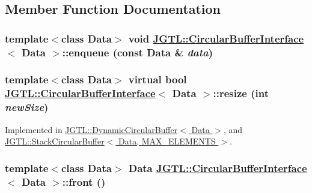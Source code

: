 \subsection{Member Function Documentation}
\hypertarget{class_j_g_t_l_1_1_circular_buffer_interface_3de938116256fe2b2db95f8f0d55ced9}{
\subsubsection[enqueue]{\setlength{\rightskip}{0pt plus 5cm}template$<$class Data$>$ void \hyperlink{class_j_g_t_l_1_1_circular_buffer_interface}{JGTL::Circular\-Buffer\-Interface}$<$ Data $>$::enqueue (const Data \& {\em data})}}
\label{class_j_g_t_l_1_1_circular_buffer_interface_3de938116256fe2b2db95f8f0d55ced9}


\hypertarget{class_j_g_t_l_1_1_circular_buffer_interface_c6976a1811fdeb5b1810e379022f67ba}{
\subsubsection[resize]{\setlength{\rightskip}{0pt plus 5cm}template$<$class Data$>$ virtual bool \hyperlink{class_j_g_t_l_1_1_circular_buffer_interface}{JGTL::Circular\-Buffer\-Interface}$<$ Data $>$::resize (int {\em new\-Size})}}
\label{class_j_g_t_l_1_1_circular_buffer_interface_c6976a1811fdeb5b1810e379022f67ba}




Implemented in \hyperlink{class_j_g_t_l_1_1_dynamic_circular_buffer_2ea8f91e985c5fec04eb8ef05898240a}{JGTL::Dynamic\-Circular\-Buffer$<$ Data $>$}, and \hyperlink{class_j_g_t_l_1_1_stack_circular_buffer_07b33fe01ef78d42d06a2cce77ffd2be}{JGTL::Stack\-Circular\-Buffer$<$ Data, MAX\_\-ELEMENTS $>$}.\hypertarget{class_j_g_t_l_1_1_circular_buffer_interface_0c7032f7235fc559deca9382329df1d7}{
\subsubsection[front]{\setlength{\rightskip}{0pt plus 5cm}template$<$class Data$>$ Data \hyperlink{class_j_g_t_l_1_1_circular_buffer_interface}{JGTL::Circular\-Buffer\-Interface}$<$ Data $>$::front ()}}
\label{class_j_g_t_l_1_1_circular_buffer_interface_0c7032f7235fc559deca9382329df1d7}


